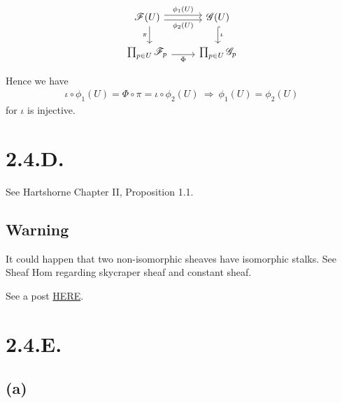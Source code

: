 \[\begin{tikzcd}
	{\mathscr F(U)} & {\mathscr G(U)} \\
	{\prod_{p\in U}\mathscr F_p} & {\prod_{p\in U}\mathscr G_p}
	\arrow["{\phi_1(U)}", shift left, from=1-1, to=1-2]
	\arrow["{\phi_2(U)}"', shift right, from=1-1, to=1-2]
	\arrow["\iota", hook, from=1-2, to=2-2]
	\arrow["\Phi"', shift right, from=2-1, to=2-2]
	\arrow["\pi"', shift left, from=1-1, to=2-1]
\end{tikzcd}\]

Hence we have 
\begin{align*}
	\iota\circ\phi_1(U)=\Phi\circ\pi=\iota\circ\phi_2(U)
	~\Rightarrow~ \phi_1(U)=\phi_2(U)
\end{align*}for $\iota$ is injective. 

\section{2.4.D.}

See Hartshorne \cite{hartshorne2013algebraic} Chapter II, Proposition 1.1.

\subsection{Warning}

It could happen that two non-isomorphic sheaves have isomorphic stalks. See Sheaf Hom  regarding skycraper sheaf and constant sheaf. 

See a post \href{https://math.stackexchange.com/questions/43314/failure-of-isomorphisms-on-stalks-to-arise-from-an-isomorphism-of-sheaves}{HERE}.

\section{2.4.E.}

\subsection{(a)}

